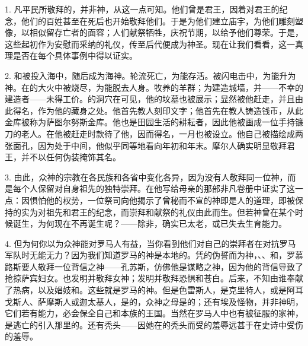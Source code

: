 1. 凡平民所敬拜的，并非神，从这一点可知。他们曾是君王，因着对君王的纪念，他们的百姓甚至在死后也开始敬拜他们。于是为他们建立庙宇，为他们雕刻塑像，以相似留存亡者的面容；人们献祭牺牲，庆祝节期，以给予他们尊荣。于是，这些起初作为安慰而采纳的礼仪，传至后代便成为神圣。现在让我们看看，这一真理是否在每个具体事例中得以证实。\par

2. 和被投入海中，随后成为海神。轮流死亡，为能存活。被闪电击中，为能升为神。在的大火中被烧尽，为能脱去人身。牧养的羊群；为建造城墙，并——不幸的建造者——未得工价。的洞穴在可见，他的坟墓也被展示；显然被他赶走，并且由此得名，作为他的藏身之处。他首先教人刻印文字；他首先在教人铸造钱币，从此金库被称为萨图尔努斯金库。他也是田园生活的耕耘者，因此他被画成一位手持镰刀的老人。在他被赶走时款待了他，因而得名，一月也被设立。他自己被描绘成两张面孔，因为处于中间，他似乎同等地看向年初和年末。摩尔人确实明显敬拜君王，并不以任何伪装掩饰其名。\par

3. 由此，众神的宗教在各民族和各省中变化各异，因为没有人敬拜同一位神，而是每个人保留对自身祖先的独特崇拜。在他写给母亲的那部非凡卷册中证实了这一点：因惧怕他的权势，一位祭司向他揭示了曾秘而不宣的神即是人的道理，即被保持的实为对祖先和君王的纪念，而崇拜和献祭的礼仪由此而生。但若神曾在某个时候诞生，为何现在不再诞生呢？——除非，确实已太老，或已失去生育能力。\par

4. 但为何你以为众神能对罗马人有益，当你看到他们对自己的崇拜者在对抗罗马军队时无能无力？因为我们知道罗马的神是本地的。凭的伪誓而为神，、、和，罗慕路斯要人敬拜一位背信之神——孔苏斯，仿佛他是谋略之神，因为他的背信导致了抢掠萨宾妇女。也发明并敬拜女神；发明并敬拜恐惧和苍白。后来，不知由谁奉献了热病，以及娼妓和。这些就是罗马的神。但是色雷斯人，是克里特人，或是阿耳戈斯人、萨摩斯人或迦太基人，是的，众神之母是的；还有埃及怪物，并非神明，它们若有能力，必会保全自己和本族的王国。当然在罗马人中也有被征服的家神，是逃亡的引入那里的。还有秃头——因她在的秃头而受的羞辱远甚于在史诗中受伤的羞辱。\par

